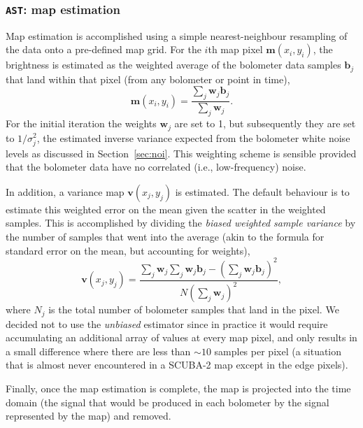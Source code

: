\documentclass[useAMS,usenatbib,nofootinbib]{mn2e}
\begin{document}
\subsubsection{\texttt{AST}: map estimation}
\label{sec:ast}

Map estimation is accomplished using a simple nearest-neighbour
resampling of the data onto a pre-defined map grid. For the $i$th map
pixel $\mathbf{m}(x_i,y_i)$, the brightness is estimated as the
weighted average of the bolometer data samples $\mathbf{b}_j$ that
land within that pixel (from any bolometer or point in time),
%
\begin{equation}
  \mathbf{m}(x_i,y_i) = \frac{\sum_j \mathbf{w}_j \mathbf{b}_j }
                             { \sum_j \mathbf{w}_j } .
\end{equation}
%
For the initial iteration the weights $\mathbf{w}_j$ are set to 1, but
subsequently they are set to $1/\sigma_j^2$, the estimated inverse
variance expected from the bolometer white noise levels as discussed
in Section~\ref{sec:noi}. This weighting scheme is sensible provided
that the bolometer data have no correlated (i.e., low-frequency)
noise.

In addition, a variance map $\mathbf{v}(x_j,y_j)$ is estimated. The
default behaviour is to estimate this weighted error on the mean given
the scatter in the weighted samples. This is accomplished by dividing
the \emph{biased weighted sample variance} by the number of samples
that went into the average (akin to the formula for standard error on
the mean, but accounting for weights),
%
\begin{equation}
\mathbf{v}(x_j,y_j) = \frac{\sum_j \mathbf{w}_j
                            \sum_j \mathbf{w}_j \mathbf{b}_j -
                            \left( \sum_j \mathbf{w}_j \mathbf{b}_j \right)^2 }
                           { N \left( \sum_j \mathbf{w}_j \right)^2 },
\end{equation}
%
where $N_j$ is the total number of bolometer samples that land in the
pixel. We decided not to use the \emph{unbiased} estimator since in
practice it would require accumulating an additional array of values
at every map pixel, and only results in a small difference where there
are less than $\sim10$ samples per pixel (a situation that is almost
never encountered in a SCUBA-2 map except in the edge pixels).

Finally, once the map estimation is complete, the map is projected
into the time domain (the signal that would be produced in each
bolometer by the signal represented by the map) and removed.
\end{document}
